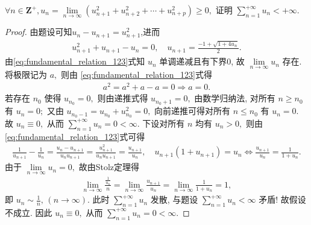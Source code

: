 \documentclass[../../main.tex]{subfiles}%
\begin{document}
\begin{example}
\(\forall n \in \bm{Z}^{+}, u_n = \lim\limits_{n \to \infty} (u_{n+1}^2 + u_{n+2}^2 + \cdots + u_{n+p}^2) \geqslant 0,\) 证明 \(\sum_{n=1}^{+\infty} u_n < +\infty.\)
\end{example}
\begin{proof}
由题设可知$u_n - u_{n+1} = u_{n+1}^2$,进而
\begin{align}
u_{n+1}^2 + u_{n+1} - u_n = 0, \quad u_{n+1} = \frac{-1 + \sqrt{1 + 4u_n}}{2}. \label{eq:fundamental_relation_123}
\end{align}
由\eqref{eq:fundamental_relation_123}式知 \(u_n\) 单调递减且有下界0, 故 \(\lim\limits_{n \to \infty} u_n\) 存在. 将极限记为 \(a,\) 则由 \eqref{eq:fundamental_relation_123}式得
\begin{align*}
a^2=a^2+a-a = 0\Longrightarrow a=0.
\end{align*}
若存在 \(n_0\) 使得 \(u_{n_0} = 0,\) 则由递推式得 \(u_{n_0+1} = 0,\) 由数学归纳法, 对所有 \(n \geqslant n_0\) 有 \(u_n = 0;\) 又由 \(u_{n_0-1} = u_{n_0} + u_{n_0}^2 = 0,\) 向前递推可得对所有 \(n \leqslant n_0\) 有 \(u_n = 0.\) 故 \(u_n \equiv 0,\) 从而 \(\sum_{n=1}^{+\infty} u_n = 0 < \infty.\) 下设对所有 \(n\) 均有 \(u_n > 0,\) 则由 \eqref{eq:fundamental_relation_123}式可得
\begin{align*}
\frac{1}{u_{n+1}} - \frac{1}{u_n} = \frac{u_n - u_{n+1}}{u_n u_{n+1}} = \frac{u_{n+1}^2}{u_n u_{n+1}} = \frac{u_{n+1}}{u_n},\quad u_{n+1}\left( 1+u_{n+1} \right) =u_n\Longleftrightarrow \frac{u_{n+1}}{u_n}=\frac{1}{1+u_n}.
\end{align*}
由于 \(\lim\limits_{n \to \infty} u_n = 0,\) 故由Stolz定理得
\begin{align*}
\lim_{n\rightarrow \infty} \frac{\frac{1}{u_n}}{n}=\lim_{n\rightarrow \infty} \frac{u_{n+1}}{u_n}=\lim_{n\rightarrow \infty} \frac{1}{1+u_n}=1,
\end{align*}
即 \(u_n \sim \frac{1}{n},\,(n\to \infty)\). 此时 \(\sum_{n=1}^{+\infty} u_n\) 发散, 与题设 \(\sum_{n=1}^{+\infty} u_n < \infty\) 矛盾! 故假设不成立. 因此 \(u_n \equiv 0,\) 从而 \(\sum_{n=1}^{+\infty} u_n = 0 < \infty.\)
\end{proof}
\end{document}
